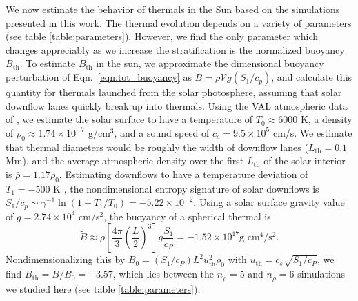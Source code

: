 \documentclass[twocolumn, amsmath, amsfonts, amssymb, trackchanges]{aastex62}
\begin{document}
We now estimate the behavior of thermals in the Sun based on the simulations presented in this work.
The thermal evolution depends on a variety of parameters (see table \ref{table:parameters}).
However, we find the only parameter which changes appreciably as we increase the stratification is the normalized buoyancy $B_\text{th}$.
To estimate $B_\text{th}$ in the sun, we approximate the dimensional buoyancy perturbation of Eqn.~\ref{eqn:tot_buoyancy} as $\tilde{B} = \rho \mathcal{V} g (S_1/c_p)$, and calculate this quantity for thermals launched from the solar photosphere, assuming that solar downflow lanes quickly break up into thermals.
Using the VAL atmospheric data of \citet{avrett&loeser2008}, we estimate the solar surface to have a temperature of $T_0 \approx 6000$ K, a density of $\rho_0 \approx 1.74 \times 10^{-7}$ g/cm$^3$, and a sound speed of $c_s = 9.5 \times 10^5$ cm/s.
We estimate that thermal diameters would be roughly the width of downflow lanes ($L_{\text{th}} = 0.1$ Mm), and the average atmospheric density over the first $L_{\text{th}}$ of the solar interior is $\bar{\rho} = 1.17\rho_0$.
Estimating downflows to have a temperature deviation of $T_1 = -500$ K \citep{borrero&bellotrubio2002}, the nondimensional entropy signature of solar downflows is $S_1/c_p \sim \gamma^{-1}\ln(1 + T_1/T_0) = -5.22 \times 10^{-2}$.
Using a solar surface gravity value of $g = 2.74 \times 10^4$ cm/s$^2$, the buoyancy of a spherical thermal is 
$$
\tilde{B} \approx \bar{\rho}\left[\frac{4\pi}{3} \left(\frac{L}{2}\right)^3\right] g \frac{S_1}{c_P} = -1.52 \times 10^{17} \text{g cm}^4/\text{s}^2.
$$
Nondimensionalizing this by $B_0 = (S_1/c_P) L^2 u_{\text{th}}^2 \rho_0$ with $u_{\text{th}} = c_s \sqrt{S_1/c_P}$, we find $B_\text{th} = \tilde{B}/B_0 = -3.57$, which lies between the $n_\rho = 5$ and $n_\rho = 6$ simulations we studied here (see table \ref{table:parameters}).
\end{document}
